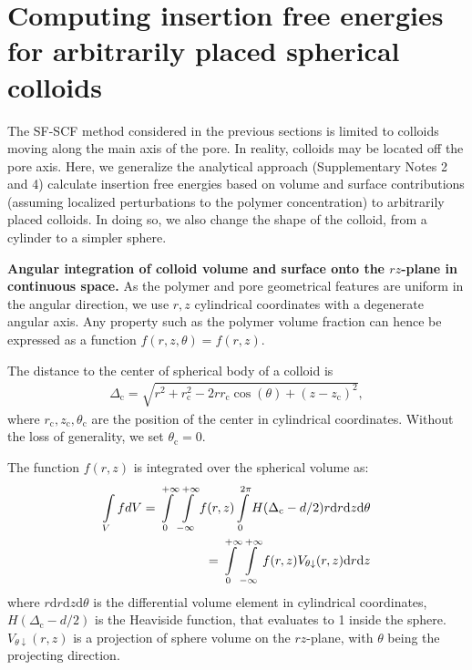 \documentclass[10pt, a4paper, twocolumn]{article}
\newcommand{\todo}[1]{\pdfcomment{#1}} %
\begin{document}
\pagebreak
\section{Computing insertion free energies for arbitrarily placed spherical colloids}

The SF-SCF method considered in the previous sections is limited to colloids moving along the main axis of the pore.
In reality, colloids may be located off the pore axis.
Here, we generalize the analytical approach (Supplementary Notes 2 and 4) \todo{ML: Supplementary Note 4} calculate insertion free energies based on volume and surface contributions (assuming localized perturbations to the polymer concentration) to arbitrarily placed colloids.
In doing so, we also change the shape of the colloid, from a cylinder to a simpler sphere.

\bigskip\noindent
\textbf{Angular integration of colloid volume and surface onto the $rz$-plane in continuous space.}
As the polymer and pore geometrical features are uniform in the angular direction, we use $r, z$ cylindrical coordinates with a degenerate angular axis.
Any property such as the polymer volume fraction can hence be expressed as a function $f(r,z,\theta) = f(r,z)$.

The distance to the center of spherical body of a colloid is 
\begin{eqnarray}
\Delta_{\text{c}} = \sqrt{r^2 + r_{\text{c}}^2 - 2 r r_{\text{c}} \cos(\theta) + (z - z_{\text{c}})^2},
\end{eqnarray} 
where $r_{\text{c}}, z_{\text{c}}, \theta_{\text{c}}$ are the position of the center in cylindrical coordinates.
Without the loss of generality, we set $\theta_{\text{c}} = 0$.

The function $f(r,z)$ is integrated over the spherical volume as:
\begin{eqnarray}
    \label{eq:int_indicator_V}
    \begin{aligned}
        \int\limits_{V} f dV
        =\int\displaylimits_{0}^{+\infty} \int\displaylimits_{-\infty}^{+\infty} f(r, z) \int\displaylimits_{0}^{2\pi}  H(\Delta_{\text{c}} - d/2) r \text{d}r \text{d}z \text{d}\theta \\
        =\int\displaylimits_{0}^{+\infty} \int\displaylimits_{-\infty}^{+\infty} f(r, z)  V_{\theta \downarrow}(r,z) \text{d}r \text{d}z
    \end{aligned}
\end{eqnarray}
where $r \text{d}r \text{d}z \text{d}\theta$ is the differential volume element in cylindrical coordinates, $H(\Delta_{\text{c}} - d/2)$ is the Heaviside function, that evaluates to 1 inside the sphere.
$V_{\theta \downarrow}(r,z)$ is a projection of sphere volume on the $rz$-plane, with $\theta$ being the projecting direction.
\end{document}
